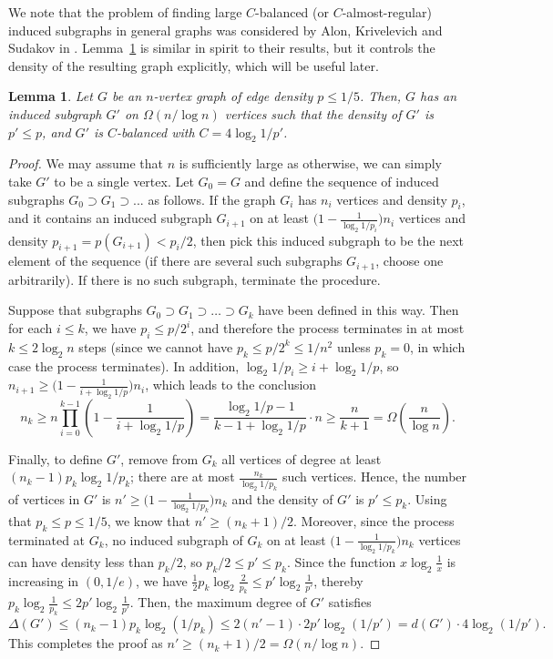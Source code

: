 \documentclass[11pt]{article}
\theoremstyle{plain}
\newtheorem{lemma}[theorem]{Lemma}
\theoremstyle{definition}
\begin{document}
We note that the problem of finding large $C$-balanced (or $C$-almost-regular) induced subgraphs in general graphs was considered by Alon, Krivelevich and Sudakov in \cite{AKS08}. Lemma~\ref{lemma:dens4_finding_balanced} is similar in spirit to their results, but it controls the density of the resulting graph explicitly, which will be useful later.

\begin{lemma}\label{lemma:dens4_finding_balanced}
    Let $G$ be an $n$-vertex graph of edge density $p\leq 1/5$. Then, $G$ has an induced subgraph $G'$ on $\Omega(n/\log n)$ vertices such that the density of $G'$ is $p'\leq p$, and $G'$ is $C$-balanced with $C=4\log_2 1/p'$.
\end{lemma}

\begin{proof}
    We may assume that $n$ is sufficiently large as otherwise, we can simply take $G'$ to be a single vertex. Let $G_0=G$ and define the sequence of induced subgraphs $G_0\supset G_1\supset...$ as follows. If the graph $G_i$ has $n_i$ vertices and density $p_i$, and it contains an induced subgraph $G_{i+1}$ on at least $\big(1-\frac{1}{\log_2 1/p_i}\big)n_i$ vertices and density $p_{i+1}=p(G_{i+1})< p_i/2$, then pick this induced subgraph to be the next element of the sequence (if there are several such subgraphs $G_{i+1}$, choose one arbitrarily). 
    If there is no such subgraph, terminate the procedure.
    
    Suppose that subgraphs $G_0\supset G_1\supset \dots \supset G_k$ have been defined in this way. Then for each $i\leq k$, we have $p_i\leq p/2^i$, and therefore the process terminates in at most $k\leq 2\log_2 n$ steps (since we cannot have $p_k\leq p/2^k\leq 1/n^2$ unless $p_k=0$, in which case the process terminates). In addition, $\log_2 1/p_i\ge i+\log_2 1/p$, so $n_{i+1} \ge \big(1-\frac{1}{i+\log_2 1/p}\big) n_i$, which leads to the conclusion 
    \[ 
        n_k\geq n\prod_{i=0}^{k-1} \left(1-\frac{1}{i+\log_2 1/p}\right)  
        = \frac{\log_2 1/p-1}{k-1+\log_2 1/p} \cdot n \ge \frac{n}{k+1} = \Omega\left(\frac{n}{\log n}\right).
    \]
    
    Finally, to define $G'$, remove from $G_k$ all vertices of degree at least $(n_k-1)p_k\log_2 1/p_k$; there are at most $\frac{n_k}{\log_2 1/p_k}$ such vertices.
    Hence, the number of vertices in $G'$ is $n' \ge \big(1-\frac{1}{\log_2 1/p_k}\big)n_k$ and the density of $G'$ is $p' \le p_k$.
    Using that $p_k \le p \le 1/5$, we know that $n' \ge (n_k+1)/2$.
    Moreover, since the process terminated at $G_k$, no induced subgraph of $G_k$ on at least $\big(1-\frac{1}{\log_2 1/p_k}\big)n_k$ vertices can have density less than $p_k/2$, so $p_k/2\le p' \le p_k$.
    Since the function $x\log_2\frac{1}{x}$ is increasing in $(0,1/e)$, we have $\frac{1}{2}p_k\log_2\frac{2}{p_k}\le p'\log_2\frac{1}{p'}$, thereby $p_k\log_2\frac{1}{p_k}\le 2p'\log_2\frac{1}{p'}$.
    Then, the maximum degree of $G'$ satisfies $$
        \Delta(G') \le (n_k-1)p_k\log_2 (1/p_k)
        \le 2(n'-1)\cdot 2p'\log_2 (1/p')
        = d(G')\cdot 4\log_2(1/p').$$
    This completes the proof as $n' \ge (n_k+1)/2=\Omega(n/\log n)$.
\end{proof}
\end{document}
